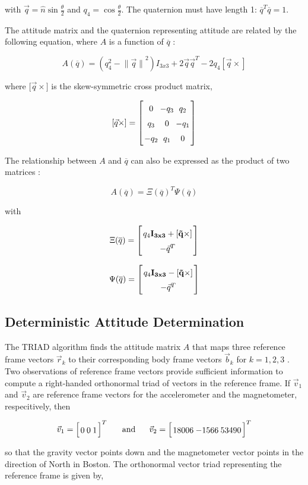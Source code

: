 \documentclass{article}
\newcommand{\mat}[2][ccccccccccccccccccccccccccccccccccccccccccccc]{\left[
        \arraycolsep=1.2pt\def\arraystretch{1.5}
        \begin{array}{#1} #2 \\ 
        \end{array} 
        \right]}
\newcommand{\tab}{ \textrm{ \ \ \ \ } }
\begin{document}
\begin{flushleft}
with $\vec{q} = \hat{n} \sin{\frac{\theta}{2}}$ and $q_4 = \cos{\frac{\theta}{2}}$. The quaternion must have length 1: $\overline{q}^T \overline{q} = 1$. 

The attitude matrix and the quaternion representing attitude are related by the following equation, where $A$ is a function of $\overline{q}$ \cite{Shuster1982}: 

\[ A(\overline{q}) = (q_4^2 - {\| \vec{q} \|}^2) I_{3x3} + 2 \vec{q}\vec{q}^T - 2 q_4 [\vec{q}\times] \]

where ${[\vec{q}\times}]$ is the skew-symmetric cross product matrix, 

\[ [\vec{q}\times] = \mat{ 0 & -q_3 & q_2 \\ q_3 & 0 & -q_1 \\ -q_2 & q_1 & 0} \]

The relationship between $A$ and $\overline{q}$ can also be expressed as the product of two matrices \cite{Markley2007}: 

\[ A(\overline{q}) = \Xi(\overline{q})^{T} \Psi(\overline{q}) \]

with 

\[ \Xi(\overline{q}) = \mat{q_4 \bf{I}_{3x3} + [\vec{q}\times] \\ -\vec{q}^T } \]

\[ \Psi(\overline{q}) = \mat{q_4 \bf{I}_{3x3} - [\vec{q}\times] \\ -\vec{q}^T } \]

\subsection{Deterministic Attitude Determination}

The TRIAD algorithm finds the attitude matrix $A$ that maps three reference frame vectors $\vec{r}_k$ to their corresponding body frame vectors $\vec{b}_k$ for $k = 1, 2, 3$ \cite{Shuster2004}. Two observations of reference frame vectors provide sufficient information to compute a right-handed orthonormal triad of vectors in the reference frame. If $\vec{v}_1$ and $\vec{v}_2$ are reference frame vectors for the accelerometer and the magnetometer, respecitively, then 

$$ \vec{v}_1 = \mat{ 0 & 0 & 1 }^{T} \tab \textrm{and} \tab \vec{v}_2 = \mat{ 18006 & -1566 & 53490 }^{T} $$ 

so that the gravity vector points down and the magnetometer vector points in the direction of North in Boston. The orthonormal vector triad representing the reference frame is given by, 


\end{flushleft}
\end{document}

